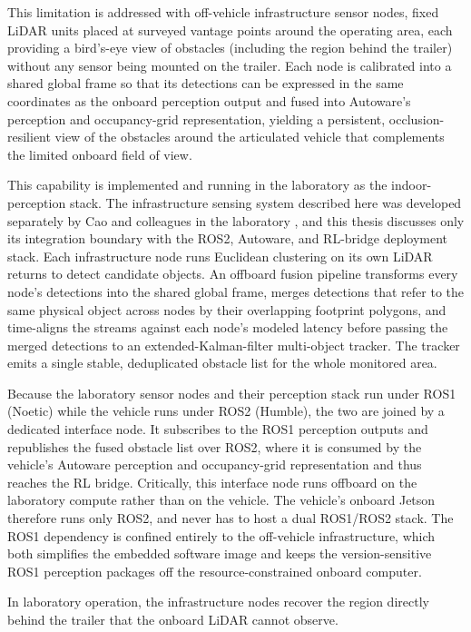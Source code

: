 This limitation is addressed with off-vehicle infrastructure sensor nodes, fixed LiDAR units placed at surveyed vantage points around the operating area, each providing a bird's-eye view of obstacles (including the region behind the trailer) without any sensor being mounted on the trailer. Each node is calibrated into a shared global frame so that its detections can be expressed in the same coordinates as the onboard perception output and fused into Autoware's perception and occupancy-grid representation, yielding a persistent, occlusion-resilient view of the obstacles around the articulated vehicle that complements the limited onboard field of view.

This capability is implemented and running in the laboratory as the indoor-perception stack. The infrastructure sensing system described here was developed separately by Cao and colleagues in the laboratory \cite{cao2023infrastructure}, and this thesis discusses only its integration boundary with the ROS2, Autoware, and RL-bridge deployment stack. Each infrastructure node runs Euclidean clustering on its own LiDAR returns to detect candidate objects. An offboard fusion pipeline transforms every node's detections into the shared global frame, merges detections that refer to the same physical object across nodes by their overlapping footprint polygons, and time-aligns the streams against each node's modeled latency before passing the merged detections to an extended-Kalman-filter multi-object tracker. The tracker emits a single stable, deduplicated obstacle list for the whole monitored area.

Because the laboratory sensor nodes and their perception stack run under ROS1 (Noetic) while the vehicle runs under ROS2 (Humble), the two are joined by a dedicated interface node. It subscribes to the ROS1 perception outputs and republishes the fused obstacle list over ROS2, where it is consumed by the vehicle's Autoware perception and occupancy-grid representation and thus reaches the RL bridge. Critically, this interface node runs offboard on the laboratory compute rather than on the vehicle. The vehicle's onboard Jetson therefore runs only ROS2, and never has to host a dual ROS1/ROS2 stack. The ROS1 dependency is confined entirely to the off-vehicle infrastructure, which both simplifies the embedded software image and keeps the version-sensitive ROS1 perception packages off the resource-constrained onboard computer.

In laboratory operation, the infrastructure nodes recover the region directly behind the trailer that the onboard LiDAR cannot observe. 

